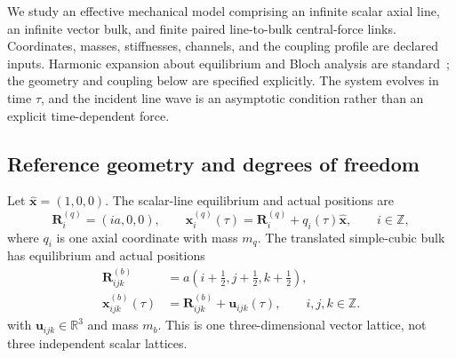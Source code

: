\documentclass[10pt,aps,pre,reprint,floatfix,notitlepage,nofootinbib]{revtex4-2}
\newcommand{\vu}{\bm{u}}
\newcommand{\vR}{\bm{R}}
\newcommand{\vx}{\bm{x}}
\newcommand{\ex}{\hat{\bm{x}}}
\begin{document}
We study an effective mechanical model comprising an infinite scalar axial line, an infinite vector bulk, and finite paired line-to-bulk central-force links. Coordinates, masses, stiffnesses, channels, and the coupling profile are declared inputs. Harmonic expansion about equilibrium and Bloch analysis are standard~\cite{BornHuang1954,Maradudin1971}; the geometry and coupling below are specified explicitly. The system evolves in time $\tau$, and the incident line wave is an asymptotic condition rather than an explicit time-dependent force.

\subsection{Reference geometry and degrees of freedom}
\label{sec:s2-geometry}

Let $\ex=(1,0,0)$. The scalar-line equilibrium and actual positions are
\begin{equation}
  \vR_i^{(q)}=(ia,0,0),
  \qquad
  \vx_i^{(q)}(\tau)=\vR_i^{(q)}+q_i(\tau)\ex,
  \qquad i\in\mathbb Z,
  \label{eq:s2-line-position}
\end{equation}
where $q_i$ is one axial coordinate with mass $m_q$. The translated simple-cubic bulk has equilibrium and actual positions
\begin{align}
  \vR_{ijk}^{(b)}
  &=a\left(i+\tfrac12,j+\tfrac12,k+\tfrac12\right),\\
  \vx_{ijk}^{(b)}(\tau)
  &=\vR_{ijk}^{(b)}+\vu_{ijk}(\tau),
  \qquad i,j,k\in\mathbb Z.
  \label{eq:s2-bulk-position}
\end{align}
with $\vu_{ijk}\in\mathbb R^3$ and mass $m_b$. This is one three-dimensional vector lattice, not three independent scalar lattices.
\end{document}
